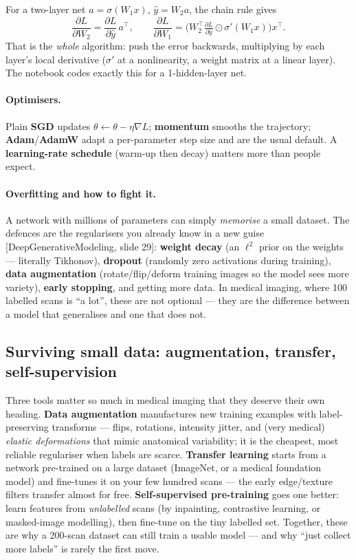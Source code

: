 \documentclass[11pt]{article}
\newcommand{\deck}[1]{\textsf{\small[#1]}}
\begin{document}
\begin{notebox}
For a two-layer net $a=\sigma(W_1x)$, $\hat y=W_2 a$, the chain rule gives
\[
\frac{\partial L}{\partial W_2}=\frac{\partial L}{\partial\hat y}\,a^{\!\top},
\qquad
\frac{\partial L}{\partial W_1}=\Big(W_2^{\!\top}\tfrac{\partial L}{\partial\hat y}\odot\sigma'(W_1x)\Big)x^{\!\top}.
\]
That is the \emph{whole} algorithm: push the error backwards, multiplying by each
layer's local derivative ($\sigma'$ at a nonlinearity, a weight matrix at a linear
layer). The notebook codes exactly this for a 1-hidden-layer net.
\end{notebox}

\paragraph{Optimisers.} Plain \textbf{SGD} updates $\theta\leftarrow\theta-\eta\nabla
L$; \textbf{momentum} smooths the trajectory; \textbf{Adam}/\textbf{AdamW} adapt
a per-parameter step size and are the usual default. A \textbf{learning-rate
schedule} (warm-up then decay) matters more than people expect.

\paragraph{Overfitting and how to fight it.} A network with millions of
parameters can simply \emph{memorise} a small dataset. The defences are the
regularisers you already know in a new guise \deck{DeepGenerativeModeling, slide
29}: \textbf{weight decay} (an $\ell^2$ prior on the weights --- literally
Tikhonov), \textbf{dropout} (randomly zero activations during training),
\textbf{data augmentation} (rotate/flip/deform training images so the model sees
more variety), \textbf{early stopping}, and getting more data. In medical imaging,
where 100 labelled scans is ``a lot'', these are not optional --- they are the
difference between a model that generalises and one that does not.

\subsection{Surviving small data: augmentation, transfer, self-supervision}

Three tools matter so much in medical imaging that they deserve their own
heading. \textbf{Data augmentation} manufactures new training examples with
label-preserving transforms --- flips, rotations, intensity jitter, and (very
medical) \emph{elastic deformations} that mimic anatomical variability; it is the
cheapest, most reliable regulariser when labels are scarce. \textbf{Transfer
learning} starts from a network pre-trained on a large dataset (ImageNet, or a
medical foundation model) and fine-tunes it on your few hundred scans --- the
early edge/texture filters transfer almost for free. \textbf{Self-supervised
pre-training} goes one better: learn features from \emph{unlabelled} scans (by
inpainting, contrastive learning, or masked-image modelling), then fine-tune on
the tiny labelled set. Together, these are why a 200-scan dataset can still train
a usable model --- and why ``just collect more labels'' is rarely the first move.
\end{document}
